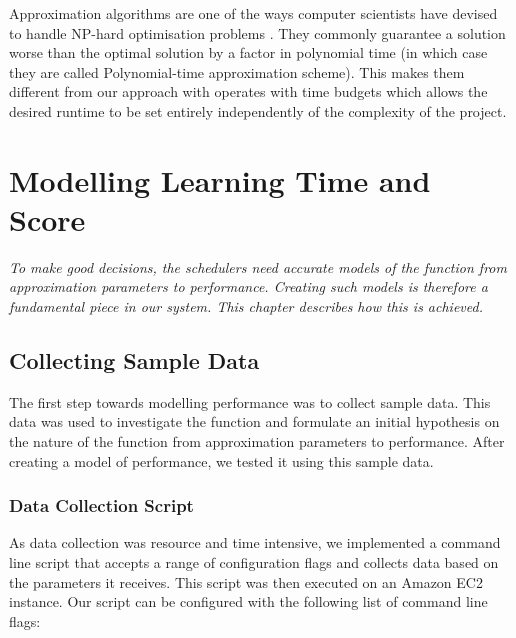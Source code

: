 \documentclass[a4paper,12pt,twoside,openright]{report}
\begin{document}
Approximation algorithms are one of the ways computer scientists have devised to handle NP-hard optimisation problems \cite{Vazirani:2001:AA:500776}. They commonly guarantee a solution worse than the optimal solution by a factor in polynomial time (in which case they are called Polynomial-time approximation scheme). This makes them different from our approach with operates with time budgets which allows the desired runtime to be set entirely independently of the complexity of the project.




\chapter{Modelling Learning Time and Score}
\label{ch:modelling}
\textit{To make good decisions, the schedulers need accurate models of the function from approximation parameters to performance. Creating such models is therefore a fundamental piece in our system. This chapter describes how this is achieved.}

\section{Collecting Sample Data}
The first step towards modelling performance was to collect sample data. This data was used to investigate the function and formulate an initial hypothesis on the nature of the function from approximation parameters to performance. After creating a model of performance, we tested it using this sample data.

\subsection{Data Collection Script}
As data collection was resource and time intensive, we implemented a command line script that accepts a range of configuration flags and collects data based on the parameters it receives. This script was then executed on an Amazon EC2 instance. Our script can be configured with the following list of command line flags:
\end{document}
